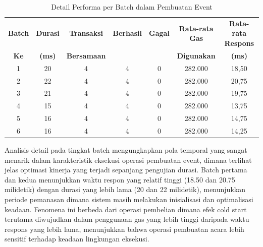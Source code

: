 \begin{table}[h!]
  \centering
  \begin{tabular}{|c|c|c|c|c|c|c|}
    \hline
    \textbf{Batch} & \textbf{Durasi} & \textbf{Transaksi} & \textbf{Berhasil} & \textbf{Gagal} & \textbf{Rata-rata Gas} & \textbf{Rata-rata Respons} \\
    \textbf{Ke}    & \textbf{(ms)}   & \textbf{Bersamaan} & \textbf{}         & \textbf{}      & \textbf{Digunakan}     & \textbf{(ms)}              \\
    \hline
    1              & 20              & 4                  & 4                 & 0              & 282.000                & 18,50                      \\
    \hline
    2              & 22              & 4                  & 4                 & 0              & 282.000                & 20,75                      \\
    \hline
    3              & 21              & 4                  & 4                 & 0              & 282.000                & 19,75                      \\
    \hline
    4              & 15              & 4                  & 4                 & 0              & 282.000                & 13,75                      \\
    \hline
    5              & 16              & 4                  & 4                 & 0              & 282.000                & 14,75                      \\
    \hline
    6              & 16              & 4                  & 4                 & 0              & 282.000                & 14,25                      \\
    \hline
  \end{tabular}
  \caption{Detail Performa per Batch dalam Pembuatan Event}
  \label{tab:event_creation_batches}
\end{table}
Analisis detail pada tingkat batch mengungkapkan pola temporal yang sangat menarik dalam karakteristik eksekusi operasi pembuatan event, dimana terlihat jelas optimasi kinerja yang terjadi sepanjang pengujian durasi. Batch pertama dan kedua menunjukkan waktu respon yang relatif tinggi (18.50 dan 20.75 milidetik) dengan durasi yang lebih lama (20 dan 22 milidetik), menunjukkan periode pemanasan dimana sistem masih melakukan inisialisasi dan optimalisasi keadaan. Fenomena ini berbeda dari operasi pembelian dimana efek cold start terutama diwujudkan dalam penggunaan gas yang lebih tinggi daripada waktu respons yang lebih lama, menunjukkan bahwa operasi pembuatan acara lebih sensitif terhadap keadaan lingkungan eksekusi.
